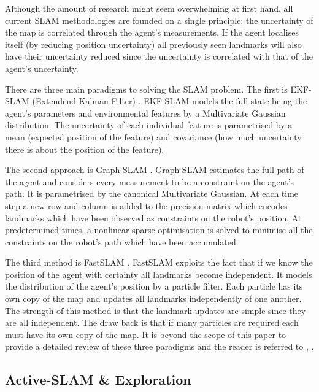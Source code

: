 
Although the amount of research might seem overwhelming at first hand, all current SLAM methodologies are founded on a single principle; 
the uncertainty of the map is correlated through the agent's measurements. If the agent localises itself (by reducing position uncertainty)
all previously seen landmarks will also have their uncertainty reduced since the uncertainty is correlated with that of the agent's uncertainty.


There are three main paradigms to solving the SLAM problem. The first is EKF-SLAM (Extendend-Kalman Filter) \cite{SLAM_part1}.
EKF-SLAM models the full state being the agent's parameters and environmental features by a Multivariate Gaussian distribution. 
The uncertainty of each individual feature is parametrised by a mean (expected position of the feature) and covariance 
(how much uncertainty there is about the position of the feature).

The second approach is Graph-SLAM \cite{TutGraphSLAM}. Graph-SLAM estimates the full path of the agent and considers every measurement to 
be a constraint on the agent's path. It is parametrised by the canonical Multivariate Gaussian. At each time step a new row and column 
is added to the precision matrix which encodes landmarks which have been observed as constraints on the robot's position.
At predetermined times, a nonlinear sparse optimisation is solved to minimise all the constraints on the robot's path which have been accumulated.

The third method is FastSLAM \cite{FastSLAM}. FastSLAM exploits the fact that if we know the position of the agent with 
certainty all landmarks become independent. It models the distribution of the agent's position by a particle filter. Each particle
has its own copy of the map and updates all landmarks independently of one another. The strength of this method is that the landmark
updates are simple since they are all independent. The draw back is that if many particles are required each must have its own copy of the map. 
It is beyond the scope of this paper to provide a detailed review of these  three paradigms and the reader is referred to \cite{Thrun_Burgard_Fox_2005}, \cite{SLAM_HBR}.

\subsection{Active-SLAM \& Exploration}

